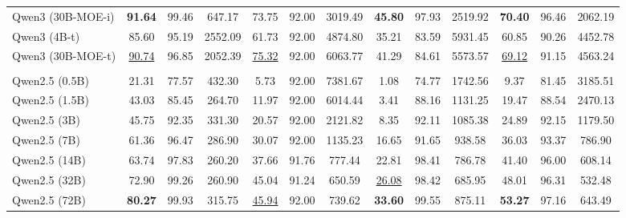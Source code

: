 \begin{table}
\begin{adjustbox}{width=\textwidth}
\begin{tabulary}{1.3\textwidth}{LCCCCCCCCCCCC}
Qwen3 (30B-MOE-i) & \textbf{91.64} & 99.46 & 647.17 & 73.75 & 92.00 & 3019.49 & \textbf{45.80} & 97.93 & 2519.92 &  \textbf{70.40} &  96.46 &  2062.19 \\

Qwen3 (4B-t) & 85.60 & 95.19 & 2552.09 & 61.73 & 92.00 & 4874.80 & 35.21 & 83.59 & 5931.45 &  60.85 &  90.26 &  4452.78 \\

Qwen3 (30B-MOE-t) & \underline{90.74} & 96.85 & 2052.39 & \underline{75.32} & 92.00 & 6063.77 & 41.29 & 84.61 & 5573.57 &  \underline{69.12} &  91.15 &  4563.24 \\
\midrule

 \\
\midrule
Qwen2.5 (0.5B) & 21.31 & 77.57 & 432.30 & 5.73 & 92.00 & 7381.67 & 1.08 & 74.77 & 1742.56 &  9.37 &  81.45 &  3185.51 \\

Qwen2.5 (1.5B) & 43.03 & 85.45 & 264.70 & 11.97 & 92.00 & 6014.44 & 3.41 & 88.16 & 1131.25 &  19.47 &  88.54 &  2470.13 \\

Qwen2.5 (3B) & 45.75 & 92.35 & 331.30 & 20.57 & 92.00 & 2121.82 & 8.35 & 92.11 & 1085.38 &  24.89 &  92.15 &  1179.50 \\

Qwen2.5 (7B) & 61.36 & 96.47 & 286.90 & 30.07 & 92.00 & 1135.23 & 16.65 & 91.65 & 938.58 &  36.03 &  93.37 &  786.90 \\

Qwen2.5 (14B) & 63.74 & 97.83 & 260.20 & 37.66 & 91.76 & 777.44 & 22.81 & 98.41 & 786.78 &  41.40 &  96.00 &  608.14 \\

Qwen2.5 (32B) & 72.90 & 99.26 & 260.90 & 45.04 & 91.24 & 650.59 & \underline{26.08} & 98.42 & 685.95 &  48.01 &  96.31 &  532.48 \\

Qwen2.5 (72B) & \textbf{80.27} & 99.93 & 315.75 & \underline{45.94} & 92.00 & 739.62 & \textbf{33.60} & 99.55 & 875.11 &  \textbf{53.27} &  97.16 &  643.49 \\


\end{tabulary}
\end{adjustbox}
\end{table}
